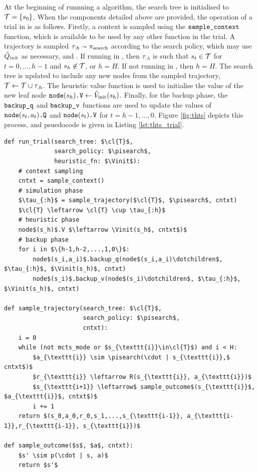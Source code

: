         At the beginning of runnning a \thtspp\ewe algorithm, the search tree is initialised to $\mathcal{T}=\{s_0\}$. When the components detailed above are provided, the operation of a trial in \thtspp\ewe is as follows. Firstly, a context is sampled using the ${\textnormal{\texttt{sample\_context}}}$ function, which is available to be used by any other function in the trial. A trajectory is sampled $\tau_{:h}\sim{\pi_{\textnormal{search}}}$ according to the search policy, which may use ${\hat{Q}_{\textnormal{init}}}$ as necessary, and \sampleoutcome. If running in \mctsmode, then $\tau_{:h}$ is such that $s_t\in\mathcal{T}$ for $t=0,...,h-1$ and $s_h\not\in\mathcal{T}$, or $h=H$. If not running in \mctsmode, then $h=H$. The search tree is updated to include any new nodes from the sampled trajectory, $\mathcal{T}\leftarrow\mathcal{T}\cup\tau_{:h}$. The heuristic value function is used to initialise the value of the new leaf node ${{\textnormal{\texttt{node}}}(s_h)\textnormal{\texttt{.V}}}\leftarrow {\hat{V}_{\textnormal{init}}}(s_h)$. Finally, for the backup phase, the ${\textnormal{\texttt{backup\_q}}}$ and ${\textnormal{\texttt{backup\_v}}}$ functions are used to update the values of ${{\textnormal{\texttt{node}}}(s_t,a_t)\textnormal{\texttt{.Q}}}$ and ${{\textnormal{\texttt{node}}}(s_t)\textnormal{\texttt{.V}}}$ for $t=h-1,...,0$. Figure \ref{fig:thts} depicts this process, and psuedocode is given in Listing \ref{lst:thts_trial}.
        
        \begin{Listing}
            \begin{lstlisting}
def run_trial(search_tree: $\cl{T}$, 
              search_policy: $\pisearch$, 
              heuristic_fn: $\Vinit$):
    # context sampling
    cntxt = sample_context()
    # simulation phase
    $\tau_{:h}$ = sample_trajectory($\cl{T}$, $\pisearch$, cntxt)
    $\cl{T} \leftarrow \cl{T} \cup \tau_{:h}$
    # heuristic phase
    node$(s_h)$.V $\leftarrow \Vinit(s_h$, cntxt$)$
    # backup phase
    for i in $\{h-1,h-2,...,1,0\}$:
        node$(s_i,a_i)$.backup_q(node$(s_i,a_i)\dotchildren$, $\tau_{:h}$, $\Vinit(s_h)$, cntxt)
        node$(s_i)$.backup_v(node$(s_i)\dotchildren$, $\tau_{:h}$, $\Vinit(s_h)$, cntxt)

def sample_trajectory(search_tree: $\cl{T}$, 
                      search_policy: $\pisearch$, 
                      cntxt):
    i = 0
    while (not mcts_mode or $s_{\texttt{i}}\in\cl{T}$) and i < H:
        $a_{\texttt{i}} \sim \pisearch(\cdot | s_{\texttt{i}},$ cntxt$)$ 
        $r_{\texttt{i}} \leftarrow R(s_{\texttt{i}}, a_{\texttt{i}})$
        $s_{\texttt{i+1}} \leftarrow$ sample_outcome$(s_{\texttt{i}}$, $a_{\texttt{i}}$, cntxt$)$
        i += 1
    return $(s_0,a_0,r_0,s_1,...,s_{\texttt{i-1}}, a_{\texttt{i-1}},r_{\texttt{i-1}}, s_{\texttt{i}})$

def sample_outcome($s$, $a$, cntxt):
    $s' \sim p(\cdot | s, a)$
    return $s'$
            \end{lstlisting}
            \caption{Psuedocode for running a trial in \thtspp.}
            \label{lst:thts_trial}
        \end{Listing}


